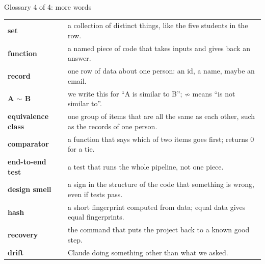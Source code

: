 \begin{frame}{Glossary 4 of 4: more words}
\small
\begin{tabular}{@{}p{3.2cm}p{9.4cm}@{}}
\textbf{set} & a collection of distinct things, like the five students in the row.\\
\textbf{function} & a named piece of code that takes inputs and gives back an answer.\\
\textbf{record} & one row of data about one person: an id, a name, maybe an email.\\
\textbf{A $\sim$ B} & we write this for ``A is similar to B''; $\not\sim$ means ``is not similar to''.\\
\textbf{equivalence class} & one group of items that are all the same as each other, such as the records of one person.\\
\textbf{comparator} & a function that says which of two items goes first; returns 0 for a tie.\\
\textbf{end-to-end test} & a test that runs the whole pipeline, not one piece.\\
\textbf{design smell} & a sign in the structure of the code that something is wrong, even if tests pass.\\
\textbf{hash} & a short fingerprint computed from data; equal data gives equal fingerprints.\\
\textbf{recovery} & the command that puts the project back to a known good step.\\
\textbf{drift} & Claude doing something other than what we asked.\\
\end{tabular}
\end{frame}
